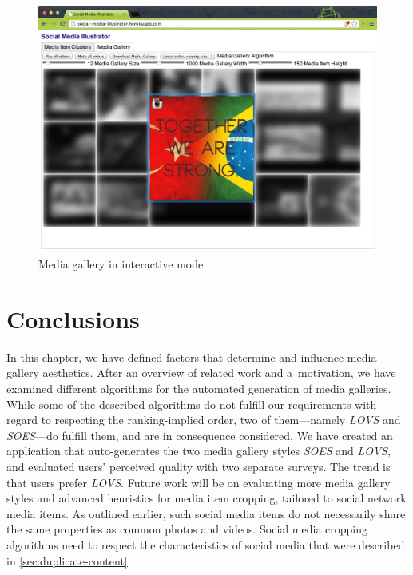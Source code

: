 \begin{figure}[!ht]
  \centering
  \includegraphics[width=1\columnwidth]{app5.png}
  \caption{Media gallery in interactive mode}
  \label{fig:mediagallerycompilation2}
\end{figure}

\section{Conclusions}

In this chapter, we have defined factors that determine and influence
media gallery aesthetics.
After an overview of related work and a~motivation,
we have examined different algorithms for the automated generation
of media galleries.
While some of the described algorithms do not fulfill our requirements
with regard to respecting the ranking-implied order,
two of them---namely \emph{LOVS} and \emph{SOES}---do fulfill them,
and are in consequence considered.
We have created an application that auto-generates the
two media gallery styles \emph{SOES} and \emph{LOVS},
and evaluated users' perceived quality with two separate surveys. 
The trend is that users prefer \emph{LOVS}.
Future work will be on evaluating more media gallery styles
and advanced heuristics for media item cropping,
tailored to social network media items.
As outlined earlier, such social media items
do not necessarily share the same properties as
common photos and videos.
Social media cropping algorithms need to respect 
the characteristics of social media
that were described in \autoref{sec:duplicate-content}.

